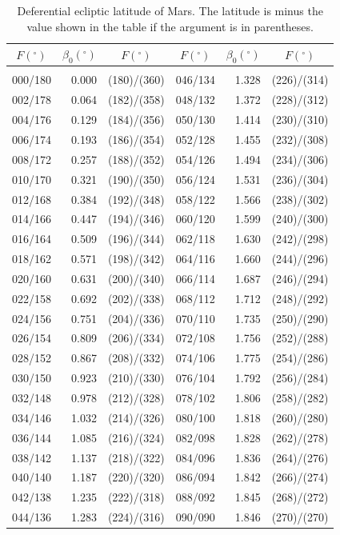 \clearpage
\begin{table}[!h]\centering
\vspace{0.25cm}
{ \begin{tabular}{crc|crc}
$F (^\circ)$ & $\beta_0(^\circ)$ & $F (^\circ)$ & $F (^\circ)$ & $\beta_0(^\circ)$ & $F (^\circ)$ \\\hline
&&\\[-1.75ex]
000/180 &  0.000 & (180)/(360)&046/134 &  1.328 & (226)/(314)\\
002/178 &  0.064 & (182)/(358)&048/132 &  1.372 & (228)/(312)\\
004/176 &  0.129 & (184)/(356)&050/130 &  1.414 & (230)/(310)\\
006/174 &  0.193 & (186)/(354)&052/128 &  1.455 & (232)/(308)\\
008/172 &  0.257 & (188)/(352)&054/126 &  1.494 & (234)/(306)\\
010/170 &  0.321 & (190)/(350)&056/124 &  1.531 & (236)/(304)\\
012/168 &  0.384 & (192)/(348)&058/122 &  1.566 & (238)/(302)\\
014/166 &  0.447 & (194)/(346)&060/120 &  1.599 & (240)/(300)\\
016/164 &  0.509 & (196)/(344)&062/118 &  1.630 & (242)/(298)\\
018/162 &  0.571 & (198)/(342)&064/116 &  1.660 & (244)/(296)\\
020/160 &  0.631 & (200)/(340)&066/114 &  1.687 & (246)/(294)\\
022/158 &  0.692 & (202)/(338)&068/112 &  1.712 & (248)/(292)\\
024/156 &  0.751 & (204)/(336)&070/110 &  1.735 & (250)/(290)\\
026/154 &  0.809 & (206)/(334)&072/108 &  1.756 & (252)/(288)\\
028/152 &  0.867 & (208)/(332)&074/106 &  1.775 & (254)/(286)\\
030/150 &  0.923 & (210)/(330)&076/104 &  1.792 & (256)/(284)\\
032/148 &  0.978 & (212)/(328)&078/102 &  1.806 & (258)/(282)\\
034/146 &  1.032 & (214)/(326)&080/100 &  1.818 & (260)/(280)\\
036/144 &  1.085 & (216)/(324)&082/098 &  1.828 & (262)/(278)\\
038/142 &  1.137 & (218)/(322)&084/096 &  1.836 & (264)/(276)\\
040/140 &  1.187 & (220)/(320)&086/094 &  1.842 & (266)/(274)\\
042/138 &  1.235 & (222)/(318)&088/092 &  1.845 & (268)/(272)\\
044/136 &  1.283 & (224)/(316)&090/090 &  1.846 & (270)/(270)\\
\end{tabular}}
\caption{Deferential ecliptic latitude of Mars.  The latitude is minus the value shown
in the table if the argument is
in parentheses. }\label{tlat1m}
\end{table}

